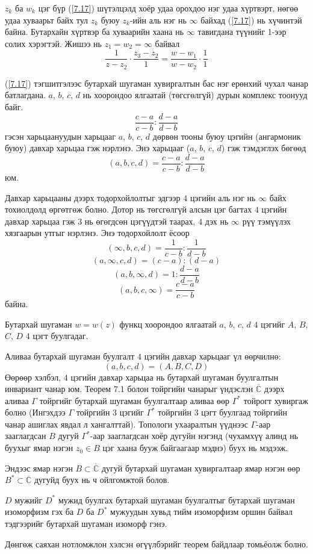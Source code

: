 \begin{hnt}
$z_k$ ба $w_k$ цэг бүр (\ref{7.17}) шүтэлцэлд хоёр удаа орохдоо нэг удаа хүртвэрт, нөгөө удаа хуваарьт байх тул $z_k$ буюу $z_k$-ийн аль нэг нь $\infty$ байхад (\ref{7.17}) нь хүчинтэй байна. Бутархайн хүртвэр ба хуваарийн хаана нь $\infty$ тавигдана түүнийг 1-ээр солих хэрэгтэй. Жишээ нь $z_1=w_2=\infty$ байвал 
$$\frac{1}{z-z_2}\cdot \frac{z_3-z_2}{1}=\frac{w-w_1}{w-w_2}\cdot \frac{1}{1}$$

(\ref{7.17}) тэгшитгэлээс бутархай шугаман хувиргалтын бас нэг ерөнхий чухал чанар батлагдана. $a$, $b$, $c$, $d$ нь хоорондоо ялгаатай (төгсгөлгүй) дурын комплекс тоонууд байг.
$$\frac{c-a}{c-b}:\frac{d-a}{d-b}$$
гэсэн харьцаануудын харьцааг $a$, $b$, $c$, $d$ дөрвөн тооны буюу цэгийн (ангармоник буюу) давхар харьцаа  гэж нэрлэнэ. Энэ харьцааг ($a$, $b$, $c$, $d$) гэж тэмдэглэх бөгөөд
$$(a,b,c,d)=\frac{c-a}{c-b}:\frac{d-a}{d-b}$$
юм.

Давхар харьцааны дээрх тодорхойлолтыг эдгээр $4$ цэгийн аль нэг нь $\infty$ байх тохиолдолд өргөтгөж болно. Дотор нь төгсгөлгүй алсын цэг багтах $4$ цэгийн давхар харьцаа гэж $3$ нь өгөгдсөн цэгүүдтэй таарах, $4$ дэх нь $\infty$ рүү тэмүүлэх хязгаарын утгыг нэрлэнэ. Энэ тодорхойлолт ёсоор
$$(\infty, b,c,d)=\frac{1}{c-b}:\frac{1}{d-b}$$
$$(a,\infty, c, d)=(c-a):(d-a)$$
$$(a,b,\infty, d)=1:\frac{d-a}{d-b}$$
$$(a,b,c,\infty) =\frac{c-a}{c-b}$$
байна.

Бутархай шугаман $w=w(z)$ функц хоорондоо ялгаатай $a$, $b$, $c$, $d$ $4$ цэгийг $A$, $B$, $C$, $D$ $4$ цэгт буулгадаг. 
\end{hnt}
\begin{thm}
Аливаа бутархай шугаман буулгалт $4$ цэгийн давхар харьцааг үл өөрчилнө:
$$(a,b,c,d)=(A,B,C,D)$$
Өөрөөр хэлбэл, $4$ цэгийн давхар харьцаа нь бутархай шугаман буулгалтын инвариант чанар юм. Теорем 7.1 болон тойргийн чанарыг үндэслэн $\overline{\mathbb{C}}$ дээрх аливаа $\Gamma$ тойргийг бутархай шугаман буулгалтаар аливаа өөр  $\Gamma^*$ тойрогт хувиргаж болно (Ингэхдээ $\Gamma$ тойргийн $3$ цэгийг $\Gamma^*$ тойргийн $3$ цэгт буулгаад тойргийн чанар ашиглах явдал л хангалттай). Топологи ухааралтын үүднээс $\Gamma$-аар зааглагдсан $B$ дугуй $\Gamma^*$-аар зааглагдсан хоёр дугуйн нэгэнд (чухамхүү алинд нь буухыг ямар нэгэн $z_0\in B$ цэг хаана бууж байгаагаар мэднэ) буух нь мэдээж.

Эндээс ямар нэгэн $B\subset \overline{\mathbb{C}}$ дугуй бутархай шугаман хувиргалтаар ямар нэгэн өөр  $B^*\subset \overline{\mathbb{C}}$ дугуйд буух нь ч ойлгомжтой болов.

$D$ мужийг $D^*$ мужид буулгах бутархай шугаман буулгалтыг бутархай шугаман изоморфизм гэх ба $D$ ба $D^*$ мужуудын хувьд тийм изоморфизм оршин байвал тэдгээрийг бутархай шугаман изоморф  гэнэ.

Дөнгөж саяхан нотломжлон хэлсэн өгүүлбэрийг теорем байдлаар томьёолж болно.
\end{thm}
